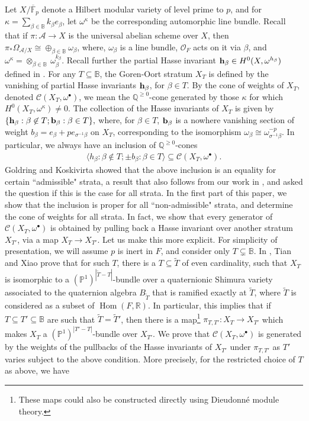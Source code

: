 \documentclass[11pt,pdflatex]{amsart}
\theoremstyle{plain}
\theoremstyle{definition}
\newcommand{\FF}{\mathbf{F}}
\newcommand{\QQ}{\mathbf{Q}}
\newcommand{\RR}{\mathbf{R}}
\newcommand{\Fpbar}{{\overline{\FF}_p}}
\theoremstyle{plain}
\theoremstyle{definition}
\theoremstyle{remark}
\numberwithin{equation}{section}
\numberwithin{figure}{section} \numberwithin{table}{subsection}
\newcommand{\Hom}{{\operatorname{Hom}}}
\newcommand{\calA}{{\mathcal{A}}}
\newcommand{\calC}{{\mathcal{C}}}
\newcommand{\calO}{{\mathcal{O}}}
\def\BB{\mathbb{B}}
\def\FF{\mathbb{F}}
\def\PP{\mathbb{P}}
\def\QQ{\mathbb{Q}}
\def\RR{\mathbb{R}}
\begin{document}
Let $X/\Fpbar$ denote a Hilbert modular variety of level prime to $p$, and for $\kappa=\sum_{\beta \in \BB} k_\beta e_\beta$, let $\omega^\kappa$ be the corresponding automorphic line bundle.  Recall that if $\pi:\calA \rightarrow X$ is the universal abelian scheme over $X$, then $\pi_\ast\Omega_{\calA/X}\cong \oplus_{\beta\in \BB}\omega_\beta$, where, $\omega_\beta$ is a line bundle, $\calO_F$ acts on it via  $\beta$, and $\omega^\kappa=\otimes_{\beta\in\BB}\!\ \omega_\beta^{k_\beta}$. Recall further the partial Hasse invariant ${\bf h}_\beta \in H^0(X,\omega^{h_\beta})$ defined in \cite{AG}. For any $T \subseteq \BB$, the Goren-Oort stratum $X_T$ is defined by the vanishing of partial Hasse invariants ${\bf h}_\beta$, for $\beta \in T$. By the cone of weights of $X_T$, denoted $\calC(X_T,\omega^\bullet)$, we mean the $\QQ^{\geq 0}$-cone generated by those $\kappa$ for which $H^0(X_T,\omega^\kappa)\neq 0$. The collection of the Hasse invariants of $X_T$ is given by  $\{ {\bf h}_\beta: \beta \not \in T; {\bf b}_\beta: \beta \in T\},$ where, for $\beta \in T$,  ${\bf b}_\beta$ is a nowhere vanishing section of weight $b_\beta=e_\beta+pe_{\sigma^{-1}\beta}$ on $X_T$, corresponding to the isomorphism $\omega_\beta \cong \omega^{-p}_{\sigma^{-1}\beta}$. In particular, we always have an inclusion of $\QQ^{\geq 0}$-cones
\begin{eqnarray}\label{eqn: inclusion of cones}
\langle h_\beta: \beta \not\in T; \pm b_\beta: \beta \in T\rangle \subseteq \calC(X_T,\omega^\bullet).
\end{eqnarray}
Goldring and Koskivirta \cite{GK} showed that the above inclusion is an equality for certain ``admissible" strata, a result that also follows from our work in \cite{DK1}, and asked the question if this is the case for all strata. In the first part of this paper, we show that the inclusion is proper for all ``non-admissible" strata, and determine the cone of weights for all strata. In fact, we show that  every generator of $\calC(X_T,\omega^\bullet)$ is obtained by pulling back a Hasse invariant over another stratum $X_{T'}$, via a map $X_T\rightarrow X_{T'}$. Let us make this more explicit. For simplicity of presentation, we will assume $p$ is inert in $F$, and consider only $T \subsetneq \BB$.  In \cite {TX}, Tian and Xiao prove that for such $T$, there is a $T \subseteq \tilde{T}$ of even cardinality, such that $X_T$ is isomorphic to a $(\PP^1)^{|\tilde{T}-T|}$-bundle over a quaternionic Shimura variety associated to the quaternion algebra $B_{\tilde{T}}$ that is ramified exactly at $\tilde{T}$, where $\tilde{T}$ is considered as a subset of $\Hom(F,\RR)$. In particular, this implies that if $T \subseteq T' \subseteq \BB$ are such that $\tilde{T}=\tilde{T}'$, then there is a map\footnote{ These maps could also be constructed directly using Dieudonn\'e module theory.} $\pi_{T,T'}:X_{T} \rightarrow X_{T'}$ which makes $X_{T}$ a  $(\PP^1)^{|T'-T|}$-bundle over $X_{T'}$. We prove that $\calC(X_T, \omega^\bullet)$ is generated by the weights of the pullbacks of the Hasse invariants of $X_{T'}$ under $\pi_{T,T'}$ as $T'$ varies subject to the above condition. More precisely, for the restricted choice of $T$ as above, we have
\end{document}
